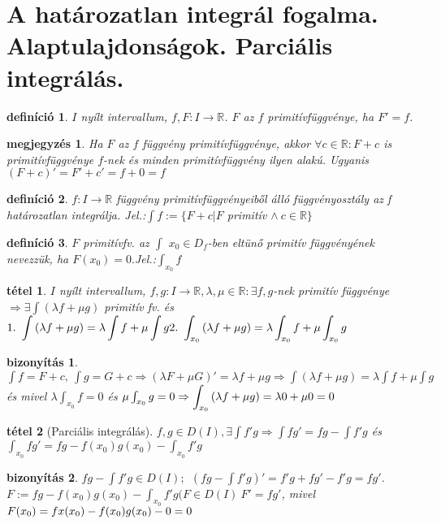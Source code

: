 \documentclass{article}
\newcommand{\fir}{f\colon I\rightarrow\mathbb{R}}
\newcommand{\la}{\lambda}
\newcommand{\R}{\mathbb{R}}
\newcommand{\n}{\rightarrow}
\newcommand{\nn}{\Rightarrow}
\newcommand{\di}{\displaystyle}
\theoremstyle{magyar}
\newtheorem{de}{definíció}[section]
\newtheorem{te}{tétel}[section]
\newtheorem{bi}{bizonyítás}[section]
\newtheorem{me}{megjegyzés}[section]
\begin{document}
  \section{A határozatlan integrál fogalma. Alaptulajdonságok. Parciális integrálás.}
  \begin{de}
    $I$ nyílt intervallum, $f,F:I\n\R$. $F$ az $f$ primitívfüggvénye, ha $F'=f$.
  \end{de}
  \begin{me}
    Ha $F$ az $f$ függvény primitívfüggvénye, akkor $\forall c\in\R:F+c$ is primitívfüggvénye $f$-nek és minden primitívfüggvény ilyen alakú. Ugyanis $(F+c)'=F'+c'=f+0=f$
  \end{me}
  \begin{de}
    $\fir$ függvény primitívfüggvényeiből álló függvényosztály az f határozatlan integrálja. Jel.:$\di\int{f}:=\{F+c| F$ primitív $\land\ c\in\R\}$
  \end{de}
  \begin{de}
    $F$ primitívfv. az $\int$ $x_0\in D_f$-ben eltünő primitív függvényének
    nevezzük, ha $F(x_0)=0. $Jel.:$\di\int_{x_0}f$
  \end{de}
  \begin{te}
    $I$ nyílt intervallum, $f,g:I\n\R, \la,\mu\in\R:\exists f,g$-nek primitív függvénye$\nn \exists\int{(\la f+\mu g)}$ primitív fv. és \\
    $\di 1.~\int{(\la f+\mu g)}=\la\int{f}+\mu\int{g}\\2.~\int_{x_0}{(\la f+\mu g)}=\la\int_{x_0}{f}+\mu\int_{x_0}{g}\\$
  \end{te}
  \begin{bi}
    $\di\int{f}=F+c,~\int{g}=G+c\nn(\la{F}+\mu{G})'=\la{f}+\mu{g}\nn\int{(\la f+\mu g)}=\la\int{f}+\mu\int{g}$ és mivel $\la\int_{x_0}{f}=0$ és $\\\mu\int_{x_0}{g}=0\nn\di\int_{x_0}{(\la f+\mu g)}=\la0+\mu0=0$
  \end{bi}
  \begin{te}[Parciális integrálás]
    $f,g\in D(I),\exists\int{f'g}\nn\int{fg'}=fg-\int{f'g}$ és $\di\int_{x_0}{fg'}=fg-f(x_0)g(x_0)-\int_{x_0}{f'g}$
  \end{te}
  \begin{bi}
    $fg-\di\int{f'g}\in D(I);\ \ (fg-\int{f'g})'=f'g+fg'-f'g=fg'$.
    $F:=fg-f(x_0)g(x_0)-\di\int_{x_0}{f'g}(F\in D(I)\ F'=fg'$, mivel$\\ F(x_0)=fx(x_0)-f(x_0)g(x_0)-0=0$
    
  \end{bi}
  \newpage
\end{document}
